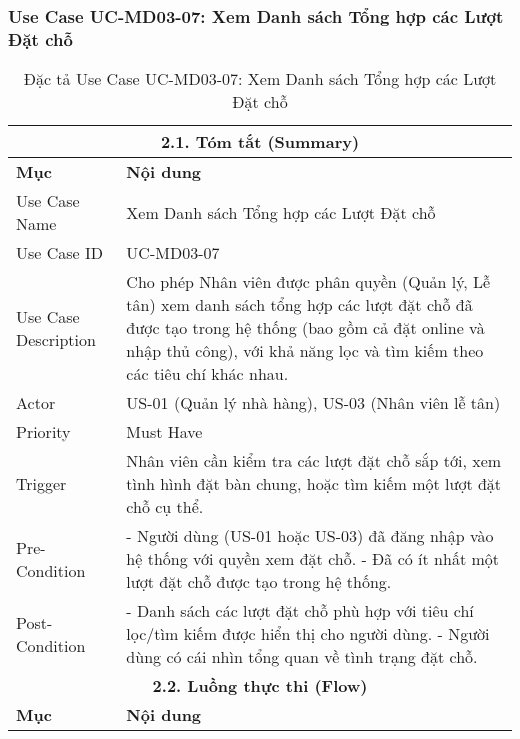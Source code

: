 
\subsubsection{Use Case UC-MD03-07: Xem Danh sách Tổng hợp các Lượt Đặt chỗ}
\begin{longtable}{|m{4cm}|p{11cm}|}
\caption{Đặc tả Use Case UC-MD03-07: Xem Danh sách Tổng hợp các Lượt Đặt chỗ} \label{tab:uc_md03_07_revised_v3} \\
\hline
\multicolumn{2}{|c|}{\textbf{2.1. Tóm tắt (Summary)}} \\
\hline
\textbf{Mục} & \textbf{Nội dung} \\
\hline
\endhead %
\hline
\endfoot %
\hline
\endlastfoot %
Use Case Name & Xem Danh sách Tổng hợp các Lượt Đặt chỗ \\
\hline
Use Case ID & UC-MD03-07 \\
\hline
Use Case Description & Cho phép Nhân viên được phân quyền (Quản lý, Lễ tân) xem danh sách tổng hợp các lượt đặt chỗ đã được tạo trong hệ thống (bao gồm cả đặt online và nhập thủ công), với khả năng lọc và tìm kiếm theo các tiêu chí khác nhau. \\
\hline
Actor & US-01 (Quản lý nhà hàng), US-03 (Nhân viên lễ tân) \\
\hline
Priority & Must Have \\
\hline
Trigger & Nhân viên cần kiểm tra các lượt đặt chỗ sắp tới, xem tình hình đặt bàn chung, hoặc tìm kiếm một lượt đặt chỗ cụ thể. \\
\hline
Pre-Condition & - Người dùng (US-01 hoặc US-03) đã đăng nhập vào hệ thống với quyền xem đặt chỗ. \newline - Đã có ít nhất một lượt đặt chỗ được tạo trong hệ thống. \\
\hline
Post-Condition & - Danh sách các lượt đặt chỗ phù hợp với tiêu chí lọc/tìm kiếm được hiển thị cho người dùng. \newline - Người dùng có cái nhìn tổng quan về tình trạng đặt chỗ. \\
\hline
\multicolumn{2}{|c|}{\textbf{2.2. Luồng thực thi (Flow)}} \\
\hline
\textbf{Mục} & \textbf{Nội dung} \\

\end{longtable}
